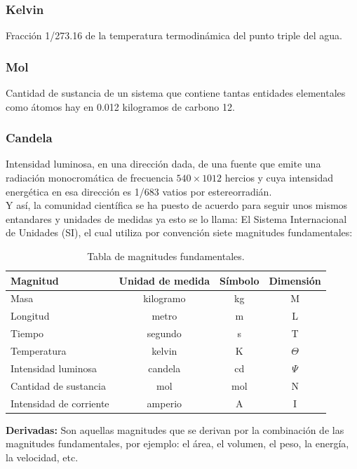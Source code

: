 \subsubsection{Kelvin}

Fracción 1/273.16 de la temperatura termodinámica del punto triple del agua.

\subsubsection{Mol}

Cantidad de sustancia de un sistema que contiene tantas entidades elementales como átomos hay en 0.012 kilogramos de carbono 12.

\subsubsection{Candela}

Intensidad luminosa, en una dirección dada, de una fuente que emite una radiación monocromática de frecuencia $540 \times 1012$ 
hercios y cuya intensidad energética en esa dirección es 1/683 vatios por estereorradián.\\ 

Y así, la comunidad científica se ha puesto de acuerdo para seguir unos mismos entandares y unidades de medidas ya esto se lo 
llama: El Sistema Internacional de Unidades (SI), el cual utiliza por convención siete magnitudes fundamentales: 

\begin{table}[H]
\centering
\begin{tabular}{lccc}
\hline
Magnitud & Unidad de medida & Símbolo & Dimensión\\
\hline
Masa & kilogramo & kg & M\\
Longitud & metro & m & L\\
Tiempo & segundo & s & T\\
Temperatura & kelvin & K & $\Theta$ \\
Intensidad luminosa & candela & cd & $\Psi$\\
Cantidad de sustancia & mol & mol & N\\
Intensidad de corriente & amperio & A & I\\
\hline
\end{tabular}
\caption{Tabla de magnitudes fundamentales.} 
\end{table}

\textbf{Derivadas:} Son aquellas magnitudes que se derivan por la combinación de las magnitudes fundamentales, por ejemplo: el 
área, el volumen, el peso, la energía, la velocidad, etc.\\

